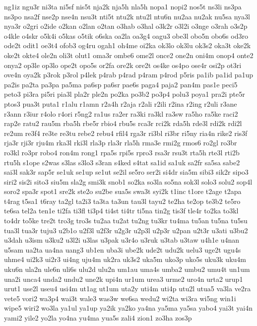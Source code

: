 {ng1iz ngu3r ni3ta ni5sf nis5t nja2k nja5h nla5h nopa1 nopi2 nos5t ns3li ns3pa ns3po nsa2f nse2p nse4n nsu3t nti5t ntu2k ntu2l ntu6n nu2aa nu2ak nu5sa nya3l nya3r o2gri o2ide o2kan o2lan o2tan o3hab o3hal o3k2r o3l2i o3nge o3rah o3s2p o4kle o4skr o5k4i o5kas o5tik o6ska oa2la oa3g4 oagu3 obe3l obo5n obo6s od3ro ode2t odit1 oe3t4 ofob3 og4ru ogah1 oh4me oi2ka ok3lo ok3lu ok3s2 oka3t oke2k oke2t okte4 ole2n oli3t olut1 oma3r ombe6 ome2l once2 one2n oni4m onop4 onte2 onya2 op3le op3lo ope2t opo5s or2fa ore2k ore2t os4ke os4po ose4r osi2p ot3ri ove4n oya2k p3rok p3rol p4lek p4rab p4rad p4ram p4rod p5ris pa1ib pa1id pa1up pa2is pa2ta pa3pa pa5ma pa6sp pa6sr pae6s paga4 paja2 pan4m pas1e peci5 peto3 pi3ra pi5ri pia3l pla2r ple2n po2ka po3b2 po3p4 polu3 poya1 pra2i pte5r ptos3 pua3t puta1 r1alu r1amn r2a4h r2aja r2ali r2ili r2ina r2ing r2uli r3ane r3ann r3iur r4olo r4ori r5ng2 ra1us ra2er ra3ki ra3kl ra3sw ra5ho ra5ke raci2 rap2e ratu2 rau5m rba5h rbe5r rbio4 rbu5s rca3r rci2k rda5h rde3l rdi2k rdi2l re2um re3f4 re3te re3tu rebe2 rebu4 rfil4 rga3r ri3bl ri3br ri5ny ria4n rike2 ris3f rja3r rji3r rju4m rka3l rki3l rla3p rla3r rla5h rma3e rmi2g rmos6 ro2gl ro3br ro3kl ro3pr robo4 ron4m rong1 rpa5s rpi5s rpro3 rsa3r rsu3t rta5h rte3l rti2b rtu5h s1ope s2was s3las s3lo3 s3ran s4ked s4tat sa1id sa1uk sa2fr sa5sa sabe2 sai3l sak3r sap5r se1uk se1up se1ut se2il se5ro ser2i si4dr sia5m sibi3 sik2r sipo3 siri2 sis2i sito3 siu5m sla2g smi3k snob1 so2ka so3la so5na sok3l solo3 solu2 sop4l soro2 spa3r spot1 sre2k ste2o su2be sua5s swa3t syi2k t1inc t1ore t2age t2apa t4rag t5sa1 t6ray ta2gl ta2i3 ta3ta ta3un tau3l tayu2 te2ha te2op te3b2 te5ro te6sa tel2a ten1e ti2fa ti3fl ti3p4 ti4st ti4tr ti5na tin2g tis3f tle4r to2ka to3kl to4dr to5ke tre2t tro3g tro3s tu2aa tu2at tu2ng tu3kr tu4ma tu5an tu5na tu5su tua3l tua3r tuju3 u2b1o u2f3l u2f3r u2g3r u2p3l u2p3r u2pan u2t3r u3ati u3bu2 u3dah u3ism u3ku2 u3l2i u3las u3pak u3r4o u3ruk u3tab u3taw u4h1e u4nan u5sam ua2ta ua4na uang3 ub1en uba3i ube2k ude2t udu2k uelu3 uge2t ugu4s uhme4 ui2k3 ui2r3 ui4ng uju4m uk2ra uk3s2 uka5m uko3p uko5s uku3k uku4m uku6n ula2n ule6n uli6s ulu2d ulu2n um1au uma4s umba2 umbu2 umu4t un1um una2i unca4 unda2 undu2 une2k upi4n ur1um urea3 urme2 uro4n urta2 urup1 urut1 use2l useu4 usi4m ut1ag ut1um uta2y uti4m uti4p utu2l utua5 va3la ve2ra vete5 vori2 wa3p4 wai3t wale3 was3w we6sa wedu2 wi2ta wi3ra wi5ng win1i wipe5 wiri2 wo3la ya1ul ya1up ya2ik ya2ko ya4na ya5ma ya5sa yabo4 yai3t yai4n yami2 yile2 yo2la yo4na yu4ma yua5s zali4 zion1 zo3ha zos3p
}
